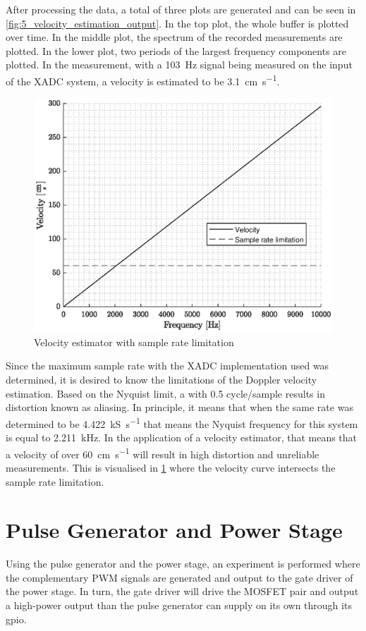 After processing the data, a total of three plots are generated and can be seen in \cref{fig:5_velocity_estimation_output}. In the top plot, the whole buffer is plotted over time. In the middle plot, the spectrum of the recorded measurements are plotted. In the lower plot, two periods of the largest frequency components are plotted. In the measurement, with a \qty{103}{\hertz} signal being measured on the input of the XADC system, a velocity is estimated to be \qty{3.1}{\centi\meter\per\second}.
\begin{figure}[htbp]
	\centering
	\includegraphics[width=.8\textwidth]{Figures/5_velocity_estimation_limit.eps}
	\caption{Velocity estimator with sample rate limitation}
	\label{fig:5_dsp_samplerate_limit}
\end{figure}
Since the maximum sample rate with the XADC implementation used was determined, it is desired to know the limitations of the Doppler velocity estimation. Based on the Nyquist limit, a with 0.5 cycle/sample results in distortion known as aliasing. In principle, it means that when the same rate was determined to be \qty{4.422}{kS\per\second} that means the Nyquist frequency for this system is equal to \qty{2.211}{\kilo\hertz}. In the application of a velocity estimator, that means that a velocity of over \qty{60}{\centi\meter\per\second} will result in high distortion and unreliable measurements. This is visualised in \cref{fig:5_dsp_samplerate_limit} where the velocity curve intersects the sample rate limitation.

\section{Pulse Generator and Power Stage}
Using the pulse generator and the power stage, an experiment is performed where the complementary PWM signals are generated and output to the gate driver of the power stage. In turn, the gate driver will drive the MOSFET pair and output a high-power output than the pulse generator can supply on its own through its \gls{gpio}.

